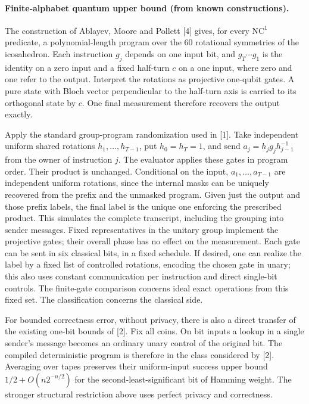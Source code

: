\documentclass[11pt]{article}
\begin{document}
\paragraph{Finite-alphabet quantum upper bound (from known constructions).}
The construction of Ablayev, Moore and Pollett [4] gives, for every $\mathrm{NC}^1$ predicate, a polynomial-length program over the $60$ rotational symmetries of the icosahedron. Each instruction $g_j$ depends on one input bit, and $g_T\cdots g_1$ is the identity on a zero input and a fixed half-turn $c$ on a one input, where zero and one refer to the output. Interpret the rotations as projective one-qubit gates. A pure state with Bloch vector perpendicular to the half-turn axis is carried to its orthogonal state by $c$. One final measurement therefore recovers the output exactly.

Apply the standard group-program randomization used in [1]. Take independent uniform shared rotations $h_1,\ldots,h_{T-1}$, put $h_0=h_T=1$, and send $a_j=h_jg_jh_{j-1}^{-1}$ from the owner of instruction $j$. The evaluator applies these gates in program order. Their product is unchanged. Conditional on the input, $a_1,\ldots,a_{T-1}$ are independent uniform rotations, since the internal masks can be uniquely recovered from the prefix and the unmasked program. Given just the output and those prefix labels, the final label is the unique one enforcing the prescribed product. This simulates the complete transcript, including the grouping into sender messages. Fixed representatives in the unitary group implement the projective gates; their overall phase has no effect on the measurement. Each gate can be sent in six classical bits, in a fixed schedule. If desired, one can realize the label by a fixed list of controlled rotations, encoding the chosen gate in unary; this also uses constant communication per instruction and direct single-bit controls. The finite-gate comparison concerns ideal exact operations from this fixed set. The classification concerns the classical side.

For bounded correctness error, without privacy, there is also a direct transfer of the existing one-bit bounds of [2]. Fix all coins. On bit inputs a lookup in a single sender's message becomes an ordinary unary control of the original bit. The compiled deterministic program is therefore in the class considered by [2]. Averaging over tapes preserves their uniform-input success upper bound $1/2+O(n2^{-n/2})$ for the second-least-significant bit of Hamming weight. The stronger structural restriction above uses perfect privacy and correctness.
\end{document}
